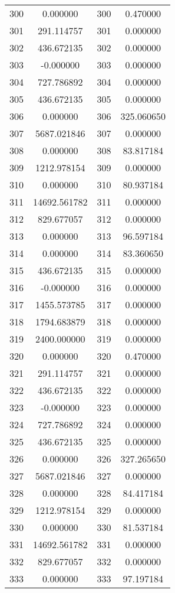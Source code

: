 \documentclass[12pt]{article}
\begin{document}
\begin{longtable}{@{}cccc@{}}
300 & 0.000000 & 300 & 0.470000 \\
301 & 291.114757 & 301 & 0.000000 \\
302 & 436.672135 & 302 & 0.000000 \\
303 & -0.000000 & 303 & 0.000000 \\
304 & 727.786892 & 304 & 0.000000 \\
305 & 436.672135 & 305 & 0.000000 \\
306 & 0.000000 & 306 & 325.060650 \\
307 & 5687.021846 & 307 & 0.000000 \\
308 & 0.000000 & 308 & 83.817184 \\
309 & 1212.978154 & 309 & 0.000000 \\
310 & 0.000000 & 310 & 80.937184 \\
311 & 14692.561782 & 311 & 0.000000 \\
312 & 829.677057 & 312 & 0.000000 \\
313 & 0.000000 & 313 & 96.597184 \\
314 & 0.000000 & 314 & 83.360650 \\
315 & 436.672135 & 315 & 0.000000 \\
316 & -0.000000 & 316 & 0.000000 \\
317 & 1455.573785 & 317 & 0.000000 \\
318 & 1794.683879 & 318 & 0.000000 \\
319 & 2400.000000 & 319 & 0.000000 \\
320 & 0.000000 & 320 & 0.470000 \\
321 & 291.114757 & 321 & 0.000000 \\
322 & 436.672135 & 322 & 0.000000 \\
323 & -0.000000 & 323 & 0.000000 \\
324 & 727.786892 & 324 & 0.000000 \\
325 & 436.672135 & 325 & 0.000000 \\
326 & 0.000000 & 326 & 327.265650 \\
327 & 5687.021846 & 327 & 0.000000 \\
328 & 0.000000 & 328 & 84.417184 \\
329 & 1212.978154 & 329 & 0.000000 \\
330 & 0.000000 & 330 & 81.537184 \\
331 & 14692.561782 & 331 & 0.000000 \\
332 & 829.677057 & 332 & 0.000000 \\
333 & 0.000000 & 333 & 97.197184 \\

\end{longtable}
\end{document}
